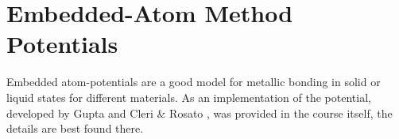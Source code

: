 \section{Embedded-Atom Method Potentials}
\begin{comment}
- describe Units 
- better discribed in the course
- good model for metalic systems
- work with gold clusters 

\end{comment}
Embedded atom-potentials are a good model for metallic bonding in solid or liquid states for different materials. As an implementation of the potential, developed by Gupta \cite{gupta} and Cleri \& Rosato \cite{rosato}, was provided in the course \cite{molDymCourse} itself, the details are best found there.


